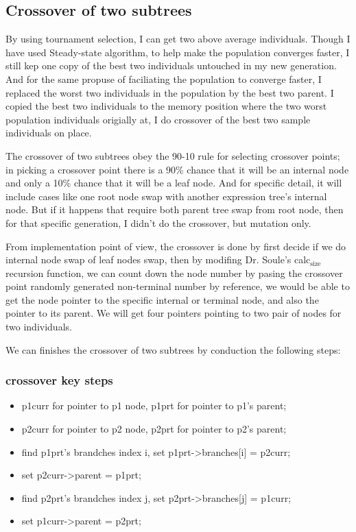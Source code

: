 \documentclass[10pt,b5paper]{article}
\begin{document}
\subsection{Crossover of two subtrees}
\label{sec-1-3}
By using tournament selection, I can get two above average individuals. Though I have used Steady-state algorithm, to help make the population converges faster, I still kep one copy of the best two individuals untouched in my new generation. And for the same propuse of faciliating the population to converge faster, I replaced the worst two individuals in the population by the best two parent. I copied the best two individuals to the memory position where the two worst population individuals origially at, I do crossover of the best two sample individuals on place.

The crossover of two subtrees obey the 90-10 rule for selecting crossover points; in picking a crossover point there is a 90\% chance that it will be an internal node and only a 10\% chance that it will be a leaf node. And for specific detail, it will include cases like one root node swap with another expression tree's internal node. But if it happens that require both parent tree swap from root node, then for that specific generation, I didn't do the crossover, but mutation only. 

From implementation point of view, the crossover is done by first decide if we do internal node swap of leaf nodes swap, then by modifing Dr. Soule's calc$_{\text{size}}$ recursion function, we can count down the node number by pasing the crossover point randomly generated non-terminal number by reference, we would be able to get the node pointer to the specific internal or terminal node, and also the pointer to its parent. We will get four pointers pointing to two pair of nodes for two individuals. 

We can finishes the crossover of two subtrees by conduction the following steps: 
\subsubsection{crossover key steps}
\label{sec-1-3-1}
\begin{itemize}
\item p1curr for pointer to p1 node, p1prt for pointer to p1's parent;
\item p2curr for pointer to p2 node, p2prt for pointer to p2's parent;
\item find p1prt's brandches index i, set p1prt->branches[i] = p2curr;
\item set p2curr->parent = p1prt;
\item find p2prt's brandches index j, set p2prt->branches[j] = p1curr;
\item set p1curr->parent = p2prt;
\end{itemize}
\end{document}
